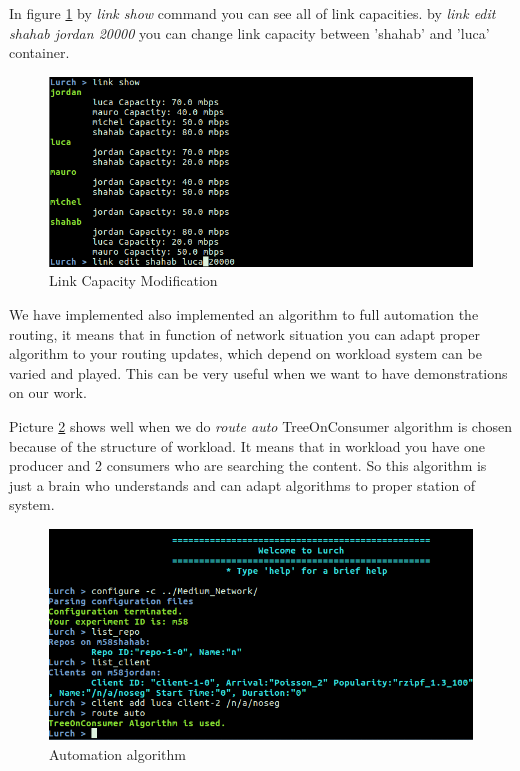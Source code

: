 In figure \ref{capacity} by \textit{link show} command you can see all of link capacities. by \textit{link edit shahab jordan 20000} you can change link capacity between 'shahab' and 'luca' container.

\begin{figure}[H]

\begin{center}

\includegraphics[scale = 0.55]{Pictures/capacity.png}

\caption{Link Capacity Modification} \label{capacity} 

\end{center}

\end{figure}
 
We have implemented also implemented an algorithm to full automation the routing, it means that in function of network situation you can adapt proper algorithm to your routing updates, which depend on workload system can be varied and played. This can be very useful when we want to have demonstrations on our work.

Picture \ref{auto} shows well when we do \textit{route auto} TreeOnConsumer algorithm is chosen because of the structure of workload. It means that in workload you have one producer and 2 consumers who are searching the content. So this algorithm is just a brain who understands and can adapt algorithms to proper station of system.

\begin{figure}[H]

\begin{center}

\includegraphics[scale = 0.35]{Pictures/auto.png}

\caption{Automation algorithm} \label{auto} 

\end{center}

\end{figure}



